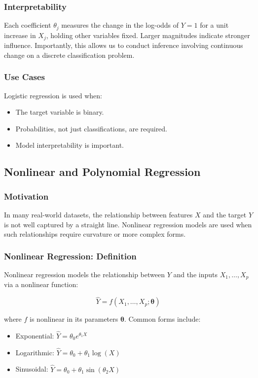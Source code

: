 \documentclass[9pt]{extarticle}
\begin{document}
\subsubsection*{Interpretability}

Each coefficient $\theta_j$ measures the change 
in the log-odds of $Y = 1$ for a unit increase in $X_j$, 
holding other variables fixed. Larger magnitudes indicate stronger influence. Importantly,
this allows us to conduct inference involving 
continuous change on a discrete classification problem.


\subsubsection*{Use Cases}

Logistic regression is used when:
\begin{itemize}
    \item The target variable is binary.
    \item Probabilities, not just classifications, are required.
    \item Model interpretability is important.
\end{itemize}

\subsection{Nonlinear and Polynomial Regression}

\subsubsection*{Motivation}

In many real-world datasets, the relationship between features $X$ and the 
target $Y$ is not well captured by a straight line. Nonlinear regression models are used when such relationships require curvature or more complex forms.

\subsubsection*{Nonlinear Regression: Definition}

Nonlinear regression models the relationship between $Y$ and the 
inputs $X_1, \dots, X_p$ via a nonlinear function:

\[
\hat{Y} = f(X_1, \dots, X_p; \boldsymbol{\theta})
\]

where $f$ is nonlinear in its parameters $\boldsymbol{\theta}$. Common forms include:
\begin{itemize}
    \item Exponential: $\hat{Y} = \theta_0 e^{\theta_1 X}$
    \item Logarithmic: $\hat{Y} = \theta_0 + \theta_1 \log(X)$
    \item Sinusoidal: $\hat{Y} = \theta_0 + \theta_1 \sin(\theta_2 X)$
\end{itemize}
\end{document}
